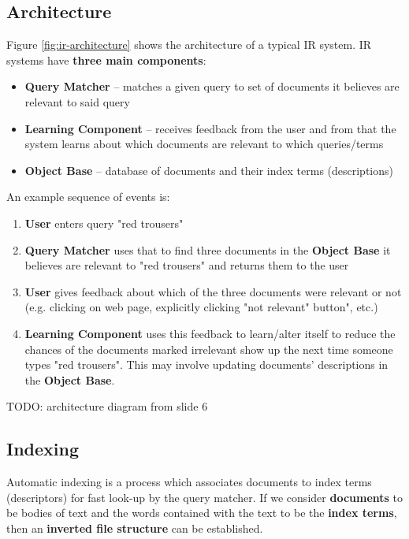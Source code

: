 \documentclass{article}
\begin{document}
\subsection{Architecture}

Figure \ref{fig:ir-architecture} shows the architecture of a typical IR system. IR systems have \textbf{three main components}:
\begin{itemize}
	\item \textbf{Query Matcher} -- matches a given query to set of documents it believes are relevant to said query
	\item \textbf{Learning Component} -- receives feedback from the user and from that the system learns about which documents are relevant to which queries/terms
	\item \textbf{Object Base} -- database of documents and their index terms (descriptions)
\end{itemize}

An example sequence of events is:
\begin{enumerate}
	\item \textbf{User} enters query "red trousers"
	\item \textbf{Query Matcher} uses that to find three documents in the \textbf{Object Base} it believes are relevant to "red trousers" and returns them to the user
	\item \textbf{User} gives feedback about which of the three documents were relevant or not (e.g. clicking on web page, explicitly clicking "not relevant" button", etc.)
	\item \textbf{Learning Component} uses this feedback to learn/alter itself to reduce the chances of the documents marked irrelevant show up the next time someone types "red trousers". This may involve updating documents' descriptions in the \textbf{Object Base}.
\end{enumerate}

TODO: architecture diagram from slide 6

\subsection{Indexing}

Automatic indexing is a process which associates documents to index terms (descriptors) for fast look-up by the query matcher. If we consider \textbf{documents} to be bodies of text and the words contained with the text to be the \textbf{index terms}, then an \textbf{inverted file structure} can be established.
\end{document}
